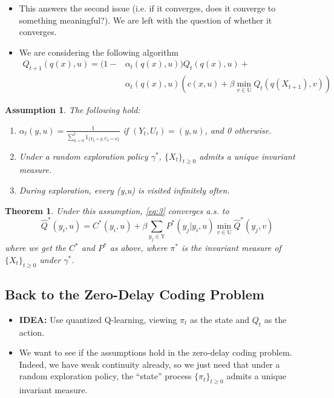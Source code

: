 \documentclass{article}
\newtheorem{theorem}{Theorem}[section]
\newtheorem{assumption}{Assumption}[section]
\begin{document}
\begin{itemize}
    \item This answers the second issue (i.e. if it converges, does it converge to something meaningful?). We are left with the question of whether it converges.
    \item We are considering the following algorithm
          \begin{equation}
              \begin{split}
                  Q_{t+1}(q(x),u) = (1- & \alpha_t(q(x),u))Q_t(q(x),u) + \\
                  & \alpha_t(q(x),u)(c(x,u)+\beta \; \underset{v\in\mathbb{U}}{\text{min}} \; Q_t(q(X_{t+1}),v))\label{eq:3}
              \end{split}
          \end{equation}
\end{itemize}

\begin{assumption} The following hold:

    \begin{enumerate}
        \item \( \alpha_t(y,u) = \frac{1}{\sum_{k=0}^t 1_{\{Y_k=y,U_k=u\}}}\) if \((Y_t,U_t) = (y,u)\), and 0 otherwise.
        \item Under a random exploration policy \(\gamma^*\), \(\{X_t\}_{t\ge0}\) admits a unique invariant measure.
        \item During exploration, every (y,u) is visited infinitely often.
    \end{enumerate}
\end{assumption}

\begin{theorem}
    Under this assumption, \eqref{eq:3} converges a.s. to
    \[ \hat{Q}^*(y_i,u) = C^*(y_i,u) + \beta \sum_{y_j \in \mathbb{Y}}P^*(y_j|y_i,u)\min_{v \in \mathbb{U}}\hat{Q}^*(y_j,v) \]
    where we get the \(C^*\) and \(P^*\) as above, where \(\pi^*\) is the invariant measure of \(\{X_t\}_{t\ge0}\) under \(\gamma^*\).
\end{theorem}

\subsection{Back to the Zero-Delay Coding Problem}
\begin{itemize}
    \item \textbf{IDEA:} Use quantized Q-learning, viewing \(\pi_t\) as the state and \(Q_t\) as the action.
    \item We want to see if the assumptions hold in the zero-delay coding problem. Indeed, we have weak continuity already, so we just need that under a random exploration policy, the ``state'' process \(\{\pi_t\}_{t\ge0}\) admits a unique invariant measure.
\end{itemize}
\end{document}
